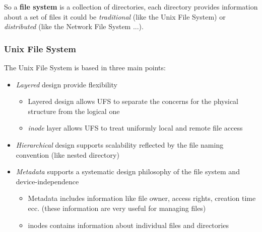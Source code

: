 So a \textbf{file system} is a collection of directories, each directory provides information about a set of files it could be \textit{traditional} (like the Unix File System) or \textit{distributed} (like the Network File System ...).

\subsubsection{Unix File System}
The Unix File System is based in three main points:
\begin{itemize}
    \item \textit{Layered} design provide flexibility
    \begin{itemize}
        \item Layered design allows UFS to separate the concerns for the physical structure from the logical one
        \item \textit{inode} layer allows UFS to treat uniformly local and remote file access
    \end{itemize}
    \item \textit{Hierarchical} design supports scalability reflected by the file naming convention (like nested directory)
    \item \textit{Metadata} supports a systematic design philosophy of the file system and device-independence
    \begin{itemize}
        \item Metadata includes information like file owner, access rights, creation time ecc. (these information are very useful for managing files)
        \item inodes contains information about individual files and directories
    \end{itemize}   
\end{itemize}   


